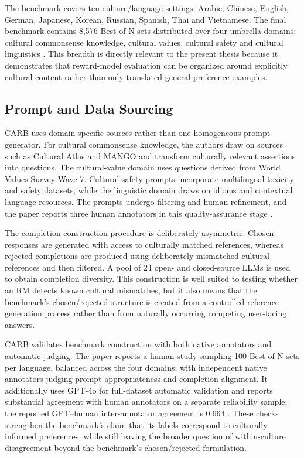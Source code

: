 The benchmark covers ten culture/language settings: Arabic, Chinese, English, German, Japanese, Korean, Russian, Spanish, Thai and Vietnamese. The final benchmark contains 8,576 Best-of-N sets distributed over four umbrella domains: cultural commonsense knowledge, cultural values, cultural safety and cultural linguistics \parencite{zhang2026carb}. This breadth is directly relevant to the present thesis because it demonstrates that reward-model evaluation can be organized around explicitly cultural content rather than only translated general-preference examples.

\subsection{Prompt and Data Sourcing}

CARB uses domain-specific sources rather than one homogeneous prompt generator. For cultural commonsense knowledge, the authors draw on sources such as Cultural Atlas and MANGO and transform culturally relevant assertions into questions. The cultural-value domain uses questions derived from World Values Survey Wave 7. Cultural-safety prompts incorporate multilingual toxicity and safety datasets, while the linguistic domain draws on idioms and contextual language resources. The prompts undergo filtering and human refinement, and the paper reports three human annotators in this quality-assurance stage \parencite{zhang2026carb}.

The completion-construction procedure is deliberately asymmetric. Chosen responses are generated with access to culturally matched references, whereas rejected completions are produced using deliberately mismatched cultural references and then filtered. A pool of 24 open- and closed-source LLMs is used to obtain completion diversity. This construction is well suited to testing whether an RM detects known cultural mismatches, but it also means that the benchmark's chosen/rejected structure is created from a controlled reference-generation process rather than from naturally occurring competing user-facing answers.

CARB validates benchmark construction with both native annotators and automatic judging. The paper reports a human study sampling 100 Best-of-N sets per language, balanced across the four domains, with independent native annotators judging prompt appropriateness and completion alignment. It additionally uses GPT-4o for full-dataset automatic validation and reports substantial agreement with human annotators on a separate reliability sample; the reported GPT--human inter-annotator agreement is 0.664 \parencite{zhang2026carb}. These checks strengthen the benchmark's claim that its labels correspond to culturally informed preferences, while still leaving the broader question of within-culture disagreement beyond the benchmark's chosen/rejected formulation.

